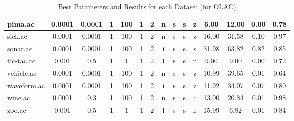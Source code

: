 \begin{table}[htbp]
\begin{tabular}{|l|c|c|c|c|c|c|c|c|c|c||c|c|c|c|}
		\hline
		pima.ac        & 0.0001   & 0.0001      & 1              & 100                 & 1             & 2        & n             & s      & s        & z        & 6.00           & 12.00          & 0.00           & 0.78           \\
		\hline
		sick.ac        & 0.0001   & 0.0001      & 1              & 100                 & 1             & 2        & n             & s      & s        & z        & 16.00          & 31.58          & 0.10           & 0.97           \\
		\hline
		sonar.ac       & 0.0001   & 0.0001      & 1              & 100                 & 1             & 2        & i             & s      & s        & s        & 31.98          & 63.82          & 0.82           & 0.85           \\
		\hline
		tic-tac.ac     & 0.001    & 0.5         & 1              & 1                   & 1             & 2        & l             & s      & s        & n        & 9.00           & 9.00           & 0.00           & 0.72           \\
		\hline
		vehicle.ac     & 0.0001   & 0.0001      & 1              & 100                 & 1             & 2        & n             & s      & s        & z        & 10.99          & 39.65          & 0.01           & 0.64           \\
		\hline
		waveform.ac    & 0.0001   & 0.0001      & 1              & 100                 & 1             & 2        & i             & s      & s        & z        & 11.92          & 34.07          & 0.07           & 0.80           \\
		\hline
		wine.ac        & 0.0001   & 0.3         & 1              & 100                 & 1             & 2        & n             & s      & s        & i        & 13.00          & 20.84          & 0.01           & 0.98           \\
		\hline
		zoo.ac         & 0.001    & 0.5         & 1              & 1                   & 1             & 2        & l             & s      & s        & n        & 15.99          & 6.82           & 0.01           & 0.84           \\
		\hline
		\end{tabular}
	\caption{Best Parameters and Results for each Dataset (for OLAC)}
	\label{tab:best_runs_for_each_db_olac}
\end{table}